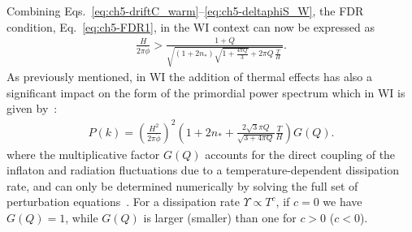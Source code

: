 Combining Eqs.~\ref{eq:ch5-driftC_warm}--\ref{eq:ch5-deltaphiS_W}, the FDR
condition, Eq.~\ref{eq:ch5-FDR1}, in the WI context can now be expressed
as
%
\begin{eqnarray}
    \frac{H}{2\pi
      \dot{\phi}}>\frac{1+Q}{\sqrt{(1+2n_*)\sqrt{1+\frac{4\pi
            Q}{3}}+2\pi Q \,\frac{T}{H}\, }}. \label{eq:ch5-FDR_warmv0}
\end{eqnarray}
As previously mentioned, in WI the addition of
thermal effects has also a significant impact on the form of the primordial power spectrum which in WI is given by~\cite{Kamali:2023lzq}:
%
\begin{eqnarray}
    P(k)=\left(\frac{H^{2}}{2 \pi \dot{\phi}}\right)^2\left(1 + 2
    n_{*}+\frac{2 \sqrt{3} \pi Q}{\sqrt{3+4 \pi Q}} \frac{T}{H}\right)
    G(Q).\label{eq:ch5-DeltaR_warm}
\end{eqnarray}
%
where the multiplicative factor $G(Q)$ accounts for the
direct coupling of the inflaton and radiation fluctuations due to a temperature-dependent dissipation rate, and can only be determined numerically by solving the full set of perturbation equations~\cite{Graham:2009bf, Bastero-Gil:2011rva,Montefalcone:2023pvh}. For a dissipation rate $\Upsilon\propto T^c$, if $c=0$ we have $G(Q)=1$, while $G(Q)$ is larger (smaller) than one for $c >0$ ($c<0$).

